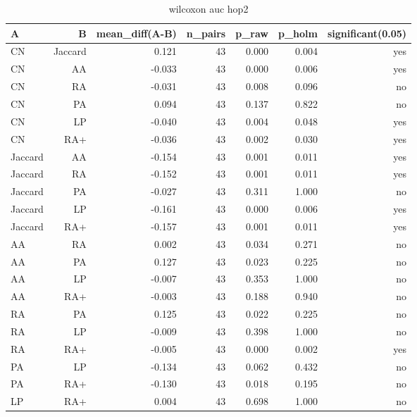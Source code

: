 \begin{table}[t]
\centering
\caption{wilcoxon auc hop2}
\label{tab:wilcoxon_auc_hop2}
\begin{tabular}{lrrrrrr}
\hline
A & B & mean\_diff(A-B) & n\_pairs & p\_raw & p\_holm & significant(0.05) \\
\hline
CN & Jaccard & 0.121 & 43 & 0.000 & 0.004 & yes \\
CN & AA & -0.033 & 43 & 0.000 & 0.006 & yes \\
CN & RA & -0.031 & 43 & 0.008 & 0.096 & no \\
CN & PA & 0.094 & 43 & 0.137 & 0.822 & no \\
CN & LP & -0.040 & 43 & 0.004 & 0.048 & yes \\
CN & RA+ & -0.036 & 43 & 0.002 & 0.030 & yes \\
Jaccard & AA & -0.154 & 43 & 0.001 & 0.011 & yes \\
Jaccard & RA & -0.152 & 43 & 0.001 & 0.011 & yes \\
Jaccard & PA & -0.027 & 43 & 0.311 & 1.000 & no \\
Jaccard & LP & -0.161 & 43 & 0.000 & 0.006 & yes \\
Jaccard & RA+ & -0.157 & 43 & 0.001 & 0.011 & yes \\
AA & RA & 0.002 & 43 & 0.034 & 0.271 & no \\
AA & PA & 0.127 & 43 & 0.023 & 0.225 & no \\
AA & LP & -0.007 & 43 & 0.353 & 1.000 & no \\
AA & RA+ & -0.003 & 43 & 0.188 & 0.940 & no \\
RA & PA & 0.125 & 43 & 0.022 & 0.225 & no \\
RA & LP & -0.009 & 43 & 0.398 & 1.000 & no \\
RA & RA+ & -0.005 & 43 & 0.000 & 0.002 & yes \\
PA & LP & -0.134 & 43 & 0.062 & 0.432 & no \\
PA & RA+ & -0.130 & 43 & 0.018 & 0.195 & no \\
LP & RA+ & 0.004 & 43 & 0.698 & 1.000 & no \\
\hline
\end{tabular}
\end{table}
